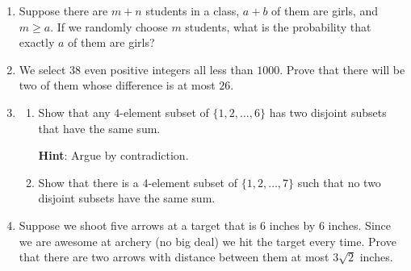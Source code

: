 \documentclass[11pt]{article}
\begin{document}
\begin{enumerate}
\item Suppose there are $m+n$ students in a class, $a+b$ of them are girls, and $m \ge a$.  If we randomly choose $m$ students, what is the probability that exactly $a$ of them are girls?

\item We select $38$ even positive integers all less than $1000$.  Prove that there will be two of them whose difference is at most $26$.

\item \begin{enumerate}
\item Show that any $4$-element subset of $\{1,2,\ldots, 6\}$ has two disjoint subsets that have the same sum. 

{\bf Hint}: Argue by contradiction. 

\item Show that there is a $4$-element subset of $\{1,2,\ldots, 7\}$ such that no two disjoint subsets have the same sum.
\end{enumerate}

\item Suppose we shoot five arrows at a target that is $6$ inches by $6$ inches.  Since we are awesome at archery (no big deal) we hit the target every time.  Prove that there are two arrows with distance between them at most $3\sqrt{2}$ inches.



\end{enumerate}
\end{document}
